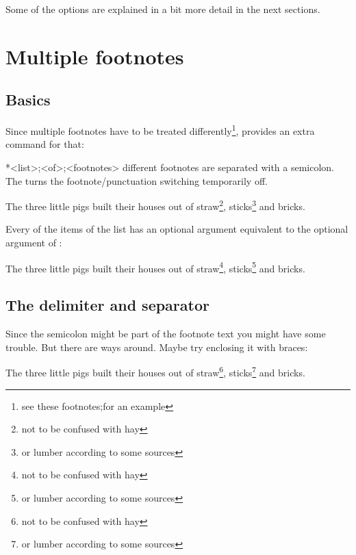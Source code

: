 \documentclass[toc=index,toc=bib]{cnpkgdoc}
\begin{document}
Some of the options are explained in a bit more detail in the next sections.

\section{Multiple footnotes}
\subsection{Basics}
Since multiple footnotes have to be treated differently\footnote{see these footnotes;for an example},
\fnpct provides an extra command for that:
\begin{beschreibung}
 *{<list>;<of>;<footnotes>} different footnotes are separated
 with a semicolon. The \code{*} turns the footnote/punctuation switching temporarily
 off.
\end{beschreibung}
\begin{beispiel}
 \begin{minipage}{.4\linewidth}
  \noindent The three little pigs built their houses
  out of straw\footnote{not to be confused with hay},
  sticks\footnote{or lumber according to some sources}
  and bricks.
 \end{minipage}
\end{beispiel}

Every of the items of the list has an optional argument equivalent to the optional
argument of :
\begin{beispiel}
 \begin{minipage}{.4\linewidth}
  \noindent The three little pigs built their houses
  out of straw\footnote{not to be confused with hay},
  sticks\footnote{or lumber according to some sources}
  and bricks.
 \end{minipage}
\end{beispiel}

\subsection{The delimiter and separator}
Since the semicolon might be part of the footnote text you might have some trouble.
But there are ways around. Maybe try enclosing it with braces:
\begin{beispiel}
 \begin{minipage}{.4\linewidth}
  \noindent The three little pigs built their houses
  out of straw\footnote{not to be confused with hay},
  sticks\footnote{or lumber according to some sources}
  and bricks.
 \end{minipage}
\end{beispiel}
\end{document}
